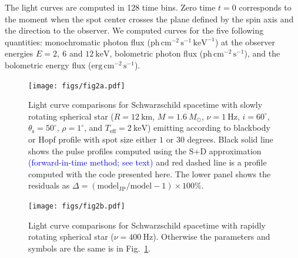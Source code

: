 \documentclass{aa}
\newcommand{\refe}[1]{\textcolor{blue}{{#1}}}
\newcommand{\sch}{Schwarzschild }
\newcommand{\Msun}{\ensuremath{M_{\odot}}}
\begin{document}
The light curves are computed in 128 time bins.  Zero time $t = 0$ corresponds to the moment when the spot center crosses the plane defined by the spin axis and the direction to the observer.  
We computed curves for the five following quantities: monochromatic photon flux ($\mathrm{ph}\,\mathrm{cm}^{-2}\,\mathrm{s}^{-1}\,\mathrm{keV}^{-1}$) at the observer energies $E = 2,~6$ and $12~\mathrm{keV}$, bolometric photon flux ($\mathrm{ph}\,\mathrm{cm}^{-2}\,\mathrm{s}^{-1}$), and the bolometric energy flux ($\mathrm{erg}\,\mathrm{cm}^{-2}\,\mathrm{s}^{-1}$).


\begin{figure}
\centering
\texttt{[image: figs/fig2a.pdf]}
\caption{\label{fig:sch_comp1}
  Light curve comparisons for \sch spacetime with slowly rotating spherical star ($R = 12~\mathrm{km}$, $M = 1.6~\Msun$, $\nu = 1~\mathrm{Hz}$, $i = 60^{\circ}$, $\theta_{\mathrm{s}} = 50^{\circ}$, $\rho = 1^{\circ}$, and $T_{\mathrm{eff}} = 2~\mathrm{keV}$) emitting according to blackbody or Hopf profile with spot size either $1$ or $30$ degrees.
    Black solid line shows the pulse profiles computed using the S+D approximation \refe{(forward-in-time method; see text)} and red dashed line is a profile computed with the code presented here.
  The lower panel shows the residuals as $\Delta = (\mathrm{model_{JP}}/\mathrm{model} -1) \times 100\%$.
}
\end{figure}

\begin{figure}
\centering
\texttt{[image: figs/fig2b.pdf]}
\caption{\label{fig:sch_comp400}
  Light curve comparisons for \sch spacetime with rapidly rotating spherical star ($\nu = 400~\mathrm{Hz}$).
  Otherwise the parameters and symbols are the same is in Fig.~\ref{fig:sch_comp1}.
}
\end{figure}
\end{document}
